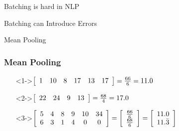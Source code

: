 \documentclass{beamer}
\begin{document}
\begin{section}{Batching is hard in NLP}
\end{section} %

\begin{section}{Batching can Introduce Errors}

    \begin{subsection}{Mean Pooling}
        \begin{frame}
            \frametitle{Mean Pooling}
            \begin{itemize}
            \item[]<1->$
                \left[ \begin{array}{*6{c}}
                    1 & 10 & 8 & 17 & 13 & 17
                \end{array} \right] = \frac{66}{6} = 11.0
            $
            \item[]
            \item[]<2->$
                \left[ \begin{array}{*4{c}}
                    22 & 24 & 9 & 13
                \end{array} \right] = \frac{68}{4} = 17.0
            $
            \item[]
            \item[]<3->$
                \left[ \begin{array}{*6{c}}
                    5 & 4 & 8 & 9 & 10 & 34 \\
                    6 & 3 & 1 & 4 & 0 & 0
                \end{array} \right] =
                \left[ \begin{array}{c}
                    \frac{66}{6} \\
                    \frac{68}{6}
                \end{array} \right] =
                \left[ \begin{array}{c}
                    11.0 \\
                    11.\bar{3}
                \end{array} \right]
            $
            \end{itemize}
\end{frame}
\end{subsection}
\end{section}
\end{document}

